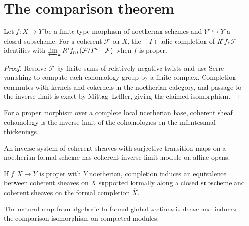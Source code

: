 \section{The comparison theorem}
\begin{theorem}\label{fga-thm-8-2-2}
Let $f:X\to Y$ be a finite type morphism of noetherian schemes and $Y'
\hookrightarrow Y$ a closed subscheme.  For a coherent $\mathcal F$ on $X$, the
$(I)$-adic completion of $R^if_*\mathcal F$ identifies with
$\varprojlim_nR^if_{n*}(\mathcal F/I^{n+1}\mathcal F)$ when $f$ is proper.
\end{theorem}
\begin{proof}
Resolve $\mathcal F$ by finite sums of relatively negative twists and use
Serre vanishing to compute each cohomology group by a finite complex.  Completion
commutes with kernels and cokernels in the noetherian category, and passage to
the inverse limit is exact by Mittag--Leffler, giving the claimed isomorphism.
\end{proof}
\begin{corollary}\label{fga-cor-8-2-4}
For a proper morphism over a complete local noetherian base, coherent sheaf
cohomology is the inverse limit of the cohomologies on the infinitesimal
thickenings.
\end{corollary}
\begin{proposition}\label{fga-prop-8-2-5-3}
An inverse system of coherent sheaves with surjective transition maps on a
noetherian formal scheme has coherent inverse-limit module on affine opens.
\end{proposition}
\begin{theorem}\label{fga-thm-8-2-6-1}
If $f:X\to Y$ is proper with $Y$ noetherian, completion induces an equivalence
between coherent sheaves on $X$ supported formally along a closed subscheme and
coherent sheaves on the formal completion $\widehat X$.
\end{theorem}
\begin{corollary}\label{fga-cor-8-2-9}
The natural map from algebraic to formal global sections is dense and induces
the comparison isomorphism on completed modules.
\end{corollary}
